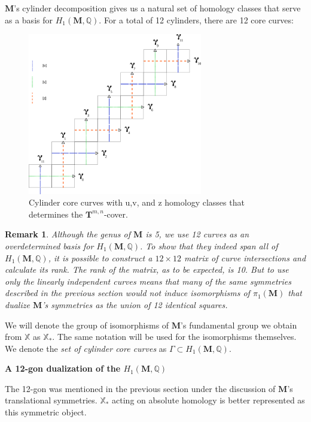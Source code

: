 \documentclass[]{article}
\newtheorem*{rem}{Remark}
\begin{document}
$\mathbf{M}$'s cylinder decomposition gives us a natural set of homology classes that serve as a basis for $H_1(\mathbf{M},\mathbb Q)$. For a total of 12 cylinders, there are 12 core curves:

\begin{figure}[H]
\includegraphics[width=3in]{homologyclass.png}
\centering
\caption{Cylinder core curves with u,v, and z homology classes that determines the $\mathbf{T}^{m,n}$-cover.}
\label{fig:homology}
\end{figure}

\begin{rem}
Although the genus of $\mathbf{M}$ is 5, we use 12 curves as an overdetermined basis for $H_1(\mathbf{M},\mathbb Q)$. To show that they indeed span all of $H_1(\mathbf{M},\mathbb Q)$, it is possible to construct a $12\times12$ matrix of curve intersections and calculate its rank. The rank of the matrix, as to be expected, is 10. But to use only the linearly independent curves means that many of the same symmetries described in the previous section would not induce isomorphisms of $\pi_1(\mathbf{M})$ that dualize $\mathbf{M}$'s symmetries as the union of 12 identical squares.
\end{rem}

We will denote the group of isomorphisms of $\mathbf{M}$'s fundamental group we obtain from $\mathbb{X}$ as $\mathbb X_*$. The same notation will be used for the isomorphisms themselves. We denote the \emph{set of cylinder core curves} as $\Gamma\subset H_1(\mathbf{M},\mathbb Q)$.

\vspace{0.1in}

\noindent\textbf{A 12-gon dualization of the $H_1(\mathbf{M},\mathbb Q)$}

The 12-gon was mentioned in the previous section under the discussion of $\mathbf{M}$'s translational symmetries. $\mathbb X_*$ acting on absolute homology is better represented as this symmetric object.
\end{document}
